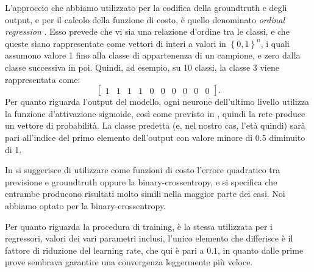 L'approccio che abbiamo utilizzato per la codifica della groundtruth e degli output, e per il calcolo della funzione di costo, è quello denominato \emph{ordinal regression} \cite{ordinalregression}. Esso prevede che vi sia una relazione d'ordine tra le classi, e che queste siano rappresentate come vettori di interi a valori in $\left\{0,1\right\}^n$, i quali assumono valore 1 fino alla classe di appartenenza di un campione, e zero dalla classe successiva in poi. Quindi, ad esempio, su 10 classi, la classe 3 viene rappresentata come:
\begin{displaymath}
    \begin{bmatrix}
    1 & 1 & 1 & 1 & 0 & 0 & 0 & 0 & 0 & 0
    \end{bmatrix}.
\end{displaymath}
Per quanto riguarda l'output del modello, ogni neurone dell'ultimo livello utilizza la funzione d'attivazione sigmoide, così come previsto in \cite{ordinalregression}, quindi la rete produce un vettore di probabilità. La classe predetta (e, nel nostro cas, l'età quindi) sarà pari all'indice del primo elemento dell'output con valore minore di 0.5 diminuito di 1. 

In \cite{ordinalregression} si suggerisce di utilizzare come funzioni di costo l'errore quadratico tra previsione e groundtruth oppure la binary-crossentropy, e si specifica che entrambe producono risultati molto simili nella maggior parte dei casi. Noi abbiamo optato per la binary-crossentropy. 

Per quanto riguarda la procedura di training, è la stessa utilizzata per i regressori, valori dei vari parametri inclusi, l'unico elemento che differisce è il fattore di riduzione del learning rate, che qui è pari a $0.1$, in quanto dalle prime prove sembrava garantire una convergenza leggermente più veloce.
